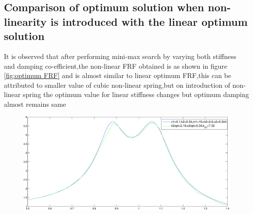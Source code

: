   \subsection{Comparison of optimum solution when non-linearity is introduced with the linear optimum solution}
  It is observed that after performing mini-max search by varying both stiffness and damping co-efficient,the non-linear FRF obtained is as shown in figure \ref{fig:optimum FRF} and is almost similar to linear optimum FRF,this can be attributed to smaller value of cubic non-linear spring,but on introduction of non-linear spring the optimum value for linear stiffness changes but optimum damping almost remains same
  \begin{figure}[h!]
  \includegraphics[width=   \textwidth,height=0.5\textwidth]
  {"figures/nonlinerassoptimal"}
  \end{figure}
